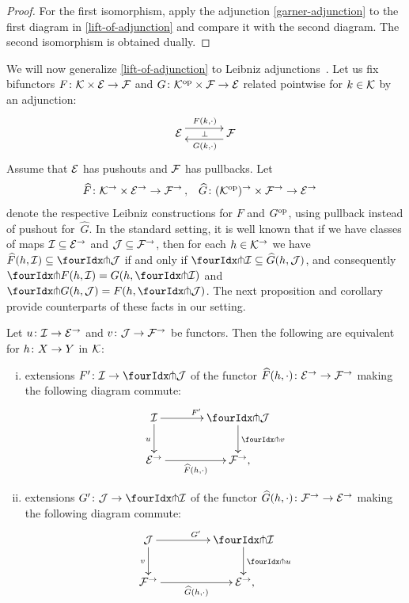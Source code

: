 \documentclass[reqno,10pt,a4paper,oneside,draft]{amsart}
\begin{document}
\begin{proof}
For the first isomorphism, apply the adjunction \eqref{garner-adjunction} to the first diagram in \cref{lift-of-adjunction} and compare it with the second diagram.
The second isomorphism is obtained dually.
\end{proof}


We will now generalize \cref{lift-of-adjunction} to Leibniz adjunctions~\cite{riehl-verity:reedy}.
Let us fix bifunctors $F \co \cal{K} \times \cal{E} \to \cal{F}$ and $G \co \cal{K}^{\op} \times \cal{F} \to \cal{E}$ related pointwise for $k \in \cal{K}$ by an adjunction:
\[
\xymatrix@C+1em{
  \cal{E}
  \ar@<5pt>[r]^{F(k, \arghole)}
  \ar@{}[r]|{\bot}
&
  \cal{F}
  \ar@<5pt>[l]^{G(k, \arghole)}
}
\]
Assume that $\cal{E}$ has pushouts and $\cal{F}$ has pullbacks.
Let
\[
\begin{aligned}
  \widehat{F} &\co \cal{K}^\to \times \cal{E}^\to \to \cal{F}^\to
\, ,&
  \widehat{G} &\co (\cal{K}^{\op})^\to \times \cal{F}^\to \to \cal{E}^\to
\end{aligned}
\]
denote the respective Leibniz constructions for $F$ and $G^{\op}$, using pullback instead of pushout for~$\widehat{G}$.
In the standard setting, it is well known that if we have classes of maps $\cal{I} \subseteq \cal{E}^\to$ and $\cal{J} \subseteq \cal{F}^\to$, then for each $h \in \cal{K}^\to$ we have $\widehat{F}(h, \cal{I}) \subseteq \liftl{\cal{J}}$ if and only if $\liftr{\cal{I}} \subseteq \widehat{G}(h, \cal{J})$, and consequently $\liftr{F(h, \cal{I})} = G(h, \liftr{\cal{I}})$ and $\liftl{G(h, \cal{J})} = F(h, \liftl{\cal{J}})$.
The next proposition and corollary provide counterparts of these facts in our setting.

\begin{proposition} \label{lift-of-leibniz-adjunction}
Let $u \co \cal{I} \to \cal{E}^\to$ and $v \co \cal{J} \to \cal{F}^\to$ be functors. 
Then the following are equivalent for $h \co X \to Y$ in $\cal{K}$:
\begin{enumerate}[(i)]
\item extensions $F' \co \cal{I} \to \liftl{\cal{J}}$ of the functor $\widehat{F}(h, \arghole) \co \cal{E}^\to \to \cal{F}^\to$ making the following diagram commute:
\[
\xymatrix@C=1.2cm{
  \cal{I}
  \ar[r]^{F'}
  \ar[d]_{u}
&
  \liftl{\cal{J}}
  \ar[d]^{\liftl{v}}
\\
  \cal{E}^\to
  \ar[r]_-{\widehat{F}(h, \arghole)}
&
  \cal{F}^\to
\rlap{,}}
\]
\item extensions $G' \co \cal{J} \to \liftr{\cal{I}}$ of the functor $\widehat{G}(h, \arghole) \co \cal{F}^\to \to \cal{E}^\to$ making the following diagram commute:
\[
\xymatrix@C+2em{
    \cal{J}
      \ar[d]_{v}
      \ar[r]^{G'}
&
  \liftr{\cal{I}}
    \ar[d]^{\liftr{u}}
\\
  \cal{F}^\to
   \ar[r]_-{\widehat{G}(h, \arghole)}
&
  \cal{E}^\to
\rlap{,}}
\]
\end{enumerate}
\end{proposition}
\end{document}
